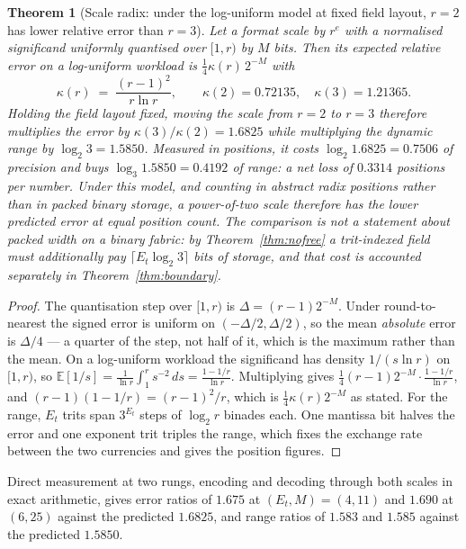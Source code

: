 \documentclass[11pt]{article}
\newtheorem{theorem}{Theorem}
\theoremstyle{definition}
\begin{document}
\begin{theorem}[Scale radix: under the log-uniform model at fixed field layout,
$r=2$ has lower relative error than $r=3$]
\label{thm:scaleradix}
Let a format scale by $r^{e}$ with a normalised significand uniformly quantised
over $[1, r)$ by $M$ bits. Then its expected relative error on a log-uniform
workload is $\tfrac14\kappa(r)\,2^{-M}$ with
\[
\kappa(r) \;=\; \frac{(r-1)^{2}}{r\ln r},
\qquad \kappa(2) = 0.72135,\quad \kappa(3) = 1.21365 .
\]
Holding the field layout fixed, moving the scale from $r=2$ to $r=3$ therefore
multiplies the error by $\kappa(3)/\kappa(2) = 1.6825$ while multiplying the
dynamic range by $\log_2 3 = 1.5850$. Measured in positions, it costs
$\log_2 1.6825 = 0.7506$ of precision and buys $\log_3 1.5850 = 0.4192$ of range:
a net loss of $0.3314$ positions per number. Under this model, and counting in
abstract radix positions rather than in packed binary storage, a power-of-two
scale therefore has the lower predicted error at equal position count. The
comparison is not a statement about packed width on a binary fabric: by
Theorem~\ref{thm:nofree} a trit-indexed field must additionally pay
$\lceil E_t\log_2 3\rceil$ bits of storage, and that cost is accounted separately
in Theorem~\ref{thm:boundary}.
\end{theorem}

\begin{proof}
The quantisation step over $[1,r)$ is $\Delta = (r-1)2^{-M}$. Under
round-to-nearest the signed error is uniform on $(-\Delta/2, \Delta/2)$, so the
mean \emph{absolute} error is $\Delta/4$ --- a quarter of the step, not half of
it, which is the maximum rather than the mean. On a log-uniform workload the
significand has density $1/(s\ln r)$ on $[1,r)$, so
$\mathbb{E}[1/s] = \frac{1}{\ln r}\int_1^{r} s^{-2}\,ds = \frac{1-1/r}{\ln r}$.
Multiplying gives $\tfrac14 (r-1)2^{-M}\cdot\frac{1-1/r}{\ln r}$, and
$(r-1)(1-1/r) = (r-1)^2/r$, which is $\tfrac14\kappa(r)2^{-M}$ as stated. For
the range, $E_t$ trits span $3^{E_t}$ steps of $\log_2 r$ binades each. One
mantissa bit halves the error and one exponent trit triples the range, which
fixes the exchange rate between the two currencies and gives the position
figures.
\end{proof}

Direct measurement at two rungs, encoding and decoding through both scales in
exact arithmetic, gives error ratios of $1.675$ at $(E_t,M) = (4,11)$ and $1.690$
at $(6,25)$ against the predicted $1.6825$, and range ratios of $1.583$ and
$1.585$ against the predicted $1.5850$.
\end{document}
